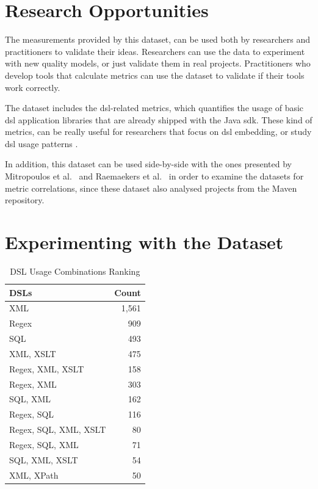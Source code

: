 \documentclass{sig-alternate}
\begin{document}
\section{Research Opportunities}
\label{sec:research-opportunities}

The measurements provided by this dataset, can be used both by researchers and practitioners to validate their ideas. Researchers can use the data to experiment with new quality models, or just validate them in real projects. Practitioners who develop tools that calculate metrics can use the dataset to validate if their tools work correctly.

The dataset includes the {\sc dsl}-related metrics, which quantifies the usage of basic {\sc dsl} application libraries that are already shipped with the Java {\sc sdk}. These kind of metrics, can be really useful for researchers that focus on {\sc dsl} embedding, or study {\sc dsl} usage patterns \cite{KARA14}.

In addition, this dataset can be used side-by-side with the ones presented by Mitropoulos et al.~\cite{HP04} and Raemaekers et al.~\cite{RDV13} in order to examine the datasets for metric correlations, since these dataset also analysed projects from the Maven repository.

\section{Experimenting with the Dataset}
\label{sec:dsl}

\begin{table}
\centering
\caption{DSL Usage Combinations Ranking}
\label{tbl:dsl-top-usage}
\begin{tabular}{l r}
 \hline
\textbf{DSLs} & \textbf{Count}\\
\hline
XML & 1,561\\
Regex & 909\\
SQL & 493\\
XML, XSLT & 475\\
Regex, XML, XSLT & 158\\
Regex, XML & 303\\
SQL, XML & 162\\
Regex, SQL & 116\\
Regex, SQL, XML, XSLT & 80\\
Regex, SQL, XML & 71\\
SQL, XML, XSLT & 54\\
XML, XPath & 50\\
\hline
\end{tabular}
\end{table}
\end{document}
